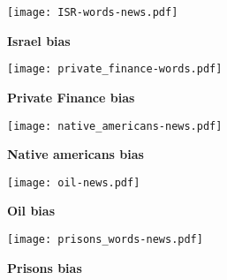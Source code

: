 \documentclass[10pt,letterpaper]{article}
\begin{document}
\begin{figure}[h] \hglue-4cm \caption{\bf Israel bias}\texttt{[image: ISR-words-news.pdf]}\label{ISR}
\end{figure}

\begin{figure}[h] \hglue-4cm \caption{\bf{Private Finance bias}}\texttt{[image: private\_finance-words.pdf]}\label{private_finance}
\end{figure}

\begin{figure}[h] \hglue-4cm \caption{\bf{Native americans bias}}\texttt{[image: native\_americans-news.pdf]}\label{native_americans}
\end{figure}

\begin{figure}[h] \hglue-4cm \caption{\bf{Oil bias}}\texttt{[image: oil-news.pdf]}\label{oil}
\end{figure}

\begin{figure}[h] \hglue-4cm \caption{\bf{Prisons bias}}\texttt{[image: prisons\_words-news.pdf]}\label{prisons}
\end{figure}
\end{document}

